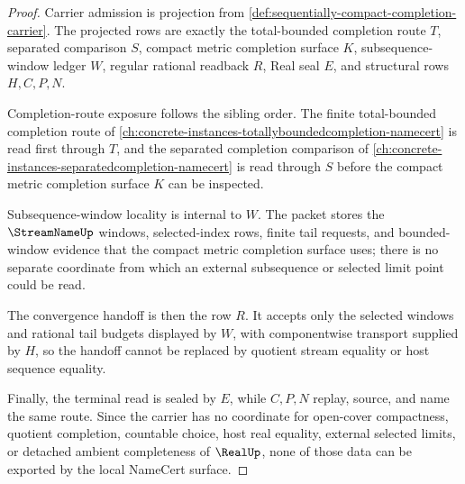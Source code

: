 \begin{proof}
Carrier admission is projection from \autoref{def:sequentially-compact-completion-carrier}. The projected rows are exactly the total-bounded completion route $T$, separated comparison $S$, compact metric completion surface $K$, subsequence-window ledger $W$, regular rational readback $R$, Real seal $E$, and structural rows $H,C,P,N$.

Completion-route exposure follows the sibling order. The finite total-bounded completion route of \autoref{ch:concrete-instances-totallyboundedcompletion-namecert} is read first through $T$, and the separated completion comparison of \autoref{ch:concrete-instances-separatedcompletion-namecert} is read through $S$ before the compact metric completion surface $K$ can be inspected.

Subsequence-window locality is internal to $W$. The packet stores the $\StreamNameUp$ windows, selected-index rows, finite tail requests, and bounded-window evidence that the compact metric completion surface uses; there is no separate coordinate from which an external subsequence or selected limit point could be read.

The convergence handoff is then the row $R$. It accepts only the selected windows and rational tail budgets displayed by $W$, with componentwise transport supplied by $H$, so the handoff cannot be replaced by quotient stream equality or host sequence equality.

Finally, the terminal read is sealed by $E$, while $C,P,N$ replay, source, and name the same route. Since the carrier has no coordinate for open-cover compactness, quotient completion, countable choice, host real equality, external selected limits, or detached ambient completeness of $\RealUp$, none of those data can be exported by the local NameCert surface.
\end{proof}

